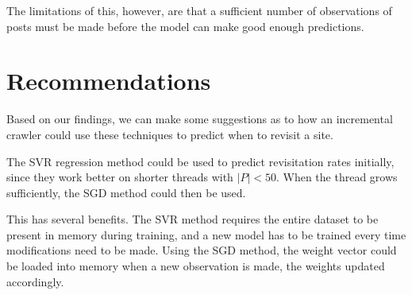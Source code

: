 The limitations of this, however, are that a sufficient number of observations 
of posts must be made before the model can make good enough predictions.

\section{Recommendations}
Based on our findings, we can make some suggestions as to how an incremental 
crawler could use these techniques to predict when to revisit a site.

The SVR regression method could be used to predict revisitation rates initially, 
since they work better on shorter threads with $|P| < 50$. When the thread grows 
sufficiently, the SGD method could then be used.

This has several benefits. The SVR method requires the entire dataset to be 
present in memory during training, and a new model has to be trained every time 
modifications need to be made.  Using the SGD method, the weight vector could be 
loaded into memory when a new observation is made, the weights updated 
accordingly.
